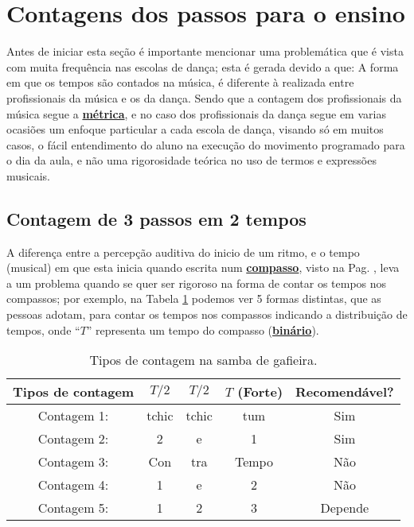 \section{Contagens dos passos para o ensino}
Antes de iniciar esta seção é importante mencionar uma
problemática que é vista com muita frequência nas escolas de dança; 
esta é gerada devido a que: A forma em que os tempos são contados 
na música, é
diferente à realizada entre profissionais da música e os da dança. 
Sendo que a contagem dos profissionais da música segue a \hyperref[def:Metrica]{\textbf{métrica}},
e no caso dos profissionais da dança segue em varias ocasiões um enfoque 
particular a cada escola de dança, visando só em muitos casos, 
o fácil entendimento do aluno na execução do movimento programado para o dia da aula, 
e não uma rigorosidade teórica no uso de termos e expressões musicais.



\subsection{Contagem de 3 passos em 2 tempos}
\label{susec:3passos2tempos}
A diferença entre a percepção auditiva do inicio de um ritmo, 
e o tempo (musical) em que esta inicia quando escrita  num \hyperref[def:Compasso]{\textbf{compasso}},
visto na Pag. \pageref{fig:RitmoVsFala}, 
leva a um problema quando se quer ser rigoroso na forma de contar os tempos nos compassos; 
por exemplo, na Tabela \ref{tab:ritmo1} podemos ver 5 formas distintas, que  as pessoas adotam, 
para contar os tempos nos compassos indicando a distribuição de tempos, 
onde ``$T$'' representa um tempo do compasso (\hyperref[subsec:compassobinario]{\textbf{binário}}).
\begin{table}[ht]
  \centering
  \begin{tabular}    {c|ccc|c}
    \hline
    Tipos de contagem       & $T/2$ & $T/2$   & $T$ (Forte) & Recomendável?\\
    \hline
    Contagem 1: & tchic  & tchic  & tum   & Sim\\
    Contagem 2: & 2     & e     & 1     & Sim\\ \hline
    Contagem 3: & Con   & tra  & Tempo & Não\\
    Contagem 4: & 1     & e     & 2     & Não\\  \hline
    Contagem 5: & 1     & 2     & 3     & Depende\\ \hline
    \hline
  \end{tabular}
  \caption{Tipos de contagem na samba de gafieira.}
\label{tab:ritmo1}
\end{table}

